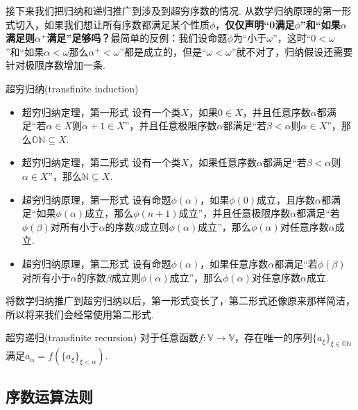 \documentclass[main.tex]{subfiles}
\begin{document}
接下来我们把归纳和递归推广到涉及到超穷序数的情况. 从数学归纳原理的第一形式切入，如果我们想让所有序数都满足某个性质\(\phi\)，\textbf{仅仅声明“0满足\(\phi\)”和“如果\(\alpha\)满足则\(\alpha^+\)满足”足够吗？}最简单的反例：我们设命题\(\phi\)为“小于\(\omega\)”，这时“\(0 < \omega\)”和“如果\(\alpha < \omega\)那么\(\alpha^+ < \omega\)”都是成立的，但是“\(\omega < \omega\)”就不对了，归纳假设还需要针对极限序数增加一条.

\begin{theorem}{超穷归纳(transfinite induction)}
    \begin{itemize}
        \item 超穷归纳定理，第一形式 \newline
        设有一个类\(X\)，如果\(0 \in X\)，并且任意序数\(\alpha\)都满足“若\(\alpha \in X\)则\(\alpha+1 \in X\)”，并且任意极限序数\(\alpha\)都满足“若\(\beta < \alpha\)则\(\alpha \in X\)”，那么\(\mathbb{ON} \subseteq X\).
        \item 超穷归纳定理，第二形式 \newline
        设有一个类\(X\)，如果任意序数\(\alpha\)都满足“若\(\beta < \alpha\)则\(\alpha \in X\)”，那么\(\mathbb{N} \subseteq X\).
        \item 超穷归纳原理，第一形式 \newline
        设有命题\(\phi(\alpha)\)，如果\(\phi(0)\)成立，且序数\(\alpha\)都满足“如果\(\phi(\alpha)\)成立，那么\(\phi(n+1)\)成立”，并且任意极限序数\(\alpha\)都满足“若\(\phi(\beta)\)对所有小于\(\alpha\)的序数\(\beta\)成立则\(\phi(\alpha)\)成立”，那么\(\phi(\alpha)\)对任意序数\(\alpha\)成立.
        \item 超穷归纳原理，第二形式 \newline
        设有命题\(\phi(\alpha)\)，如果任意序数\(\alpha\)都满足“若\(\phi(\beta)\)对所有小于\(\alpha\)的序数\(\beta\)成立则\(\phi(\alpha)\)成立”，那么\(\phi(\alpha)\)对任意序数\(\alpha\)成立.
    \end{itemize}
\end{theorem}

将数学归纳推广到超穷归纳以后，第一形式变长了，第二形式还像原来那样简洁，所以将来我们会经常使用第二形式.

\begin{theorem}{超穷递归(transfinite recursion)}
    对于任意函数\(f: \mathbb{V} \to \mathbb{V}\)，存在唯一的序列\(\{a_\xi\}_{\xi \in \mathbb{ON}}\)满足\(a_\alpha = f(\{a_\xi\}_{\xi < \alpha})\).
\end{theorem}
    
\subsection{序数运算法则}
\end{document}
